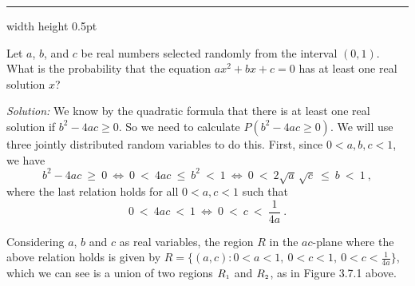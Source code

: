 \vspace{3mm}
\hrule width \textwidth height 0.5pt
\begin{exmp}\label{exmp:quadprob}
 Let $a$, $b$, and $c$ be real numbers selected randomly from the interval $(0,1)$. What is the probability that the
 equation $ax^2 + bx + c = 0$ has at least one real solution $x$?\vspace{1mm}

 \par\noindent \emph{Solution:} We know by the quadratic formula that there is at least one real solution if
 $b^2 - 4ac \ge 0$. So we need to calculate $P(b^2 - 4ac \ge 0)$. We will use three jointly distributed random variables
 to do this. First, since $0 < a,b,c < 1$, we have
  \begin{displaymath}
  b^2 - 4ac ~\ge~ 0 ~\Leftrightarrow~ 0 ~<~ 4ac ~\le~ b^2 ~<~ 1 ~\Leftrightarrow~ 0 ~<~ 2\sqrt{a}\,\sqrt{c} ~\le~ b ~<~ 1 ~,
 \end{displaymath}
 where the last relation holds for all $0 < a,c < 1$ such that
 \begin{displaymath}
 0 ~<~ 4ac ~<~ 1 ~\Leftrightarrow~ 0 ~<~ c ~<~ \frac{1}{4a} ~.
 \end{displaymath}
 
 Considering $a$, $b$ and $c$ as real variables, the region $R$ in the $ac$-plane where the above relation holds is
 given by
 $R = \lbrace (a,c): 0 < a < 1,~0 < c < 1,~0 < c < \frac{1}{4a} \rbrace$, which we can see is a union of two regions
 $R_{\scriptscriptstyle 1}$ and $R_{\scriptscriptstyle 2}$, as in  Figure 3.7.1 above.
 

\end{exmp}
